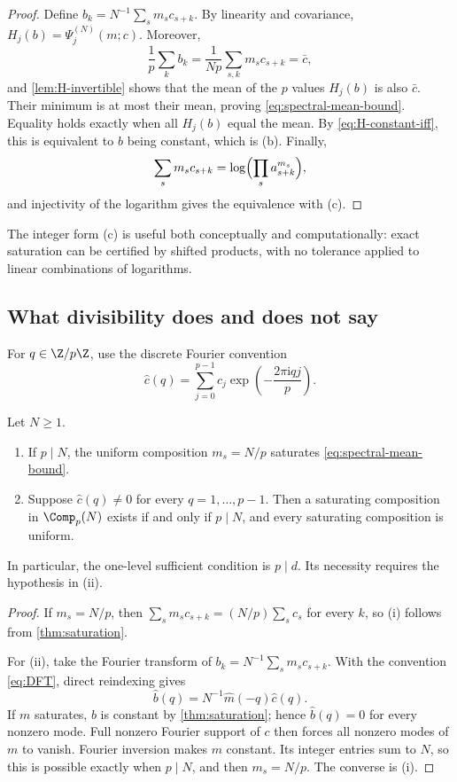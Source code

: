 \begin{proof}
Define $b_k=N^{-1}\sum_s m_sc_{s+k}$.  By linearity and covariance,
$H_j(b)=\Psi_j^{(N)}(m;c)$.  Moreover,
\[
 \frac1p\sum_kb_k
 =\frac{1}{Np}\sum_{s,k}m_sc_{s+k}
 =\bar c,
\]
and \cref{lem:H-invertible} shows that the mean of the $p$ values $H_j(b)$
is also $\bar c$.  Their minimum is at most their mean, proving
\eqref{eq:spectral-mean-bound}.  Equality holds exactly when all $H_j(b)$
equal the mean.  By \eqref{eq:H-constant-iff}, this is equivalent to $b$
being constant, which is (b).  Finally,
\[
 \sum_sm_sc_{s+k}=\log\Bigl(\prod_sa_{s+k}^{m_s}\Bigr),
\]
and injectivity of the logarithm gives the equivalence with (c).
\end{proof}

The integer form (c) is useful both conceptually and computationally: exact
saturation can be certified by shifted products, with no tolerance applied to
linear combinations of logarithms.

\subsection{What divisibility does and does not say}

For $q\in\Z/p\Z$, use the discrete Fourier convention
\begin{equation}
 \widehat c(q)=\sum_{j=0}^{p-1}c_j
 \exp\!\left(-\frac{2\pi\mathrm i qj}{p}\right).
 \label{eq:DFT}
\end{equation}

\begin{theorem}
\label{thm:fourier-divisibility}
Let $N\geq1$.
\begin{enumerate}[label=(\roman*)]
  \item If $p\mid N$, the uniform composition $m_s=N/p$ saturates
  \eqref{eq:spectral-mean-bound}.
  \item Suppose $\widehat c(q)\neq0$ for every $q=1,\ldots,p-1$.  Then a
  saturating composition in $\Comp_p(N)$ exists if and only if $p\mid N$,
  and every saturating composition is uniform.
\end{enumerate}
In particular, the one-level sufficient condition is $p\mid d$.  Its
necessity requires the hypothesis in (ii).
\end{theorem}

\begin{proof}
If $m_s=N/p$, then
$\sum_s m_sc_{s+k}=(N/p)\sum_sc_s$ for every $k$, so (i) follows from
\cref{thm:saturation}.

For (ii), take the Fourier transform of
$b_k=N^{-1}\sum_sm_sc_{s+k}$.  With the convention
\eqref{eq:DFT}, direct reindexing gives
\begin{equation}
 \widehat b(q)=N^{-1}\widehat m(-q)\widehat c(q).
 \label{eq:fourier-product}
\end{equation}
If $m$ saturates, $b$ is constant by \cref{thm:saturation}; hence
$\widehat b(q)=0$ for every nonzero mode.  Full nonzero Fourier support of
$c$ then forces all nonzero modes of $m$ to vanish.  Fourier inversion makes
$m$ constant.  Its integer entries sum to $N$, so this is possible exactly
when $p\mid N$, and then $m_s=N/p$.  The converse is (i).
\end{proof}

